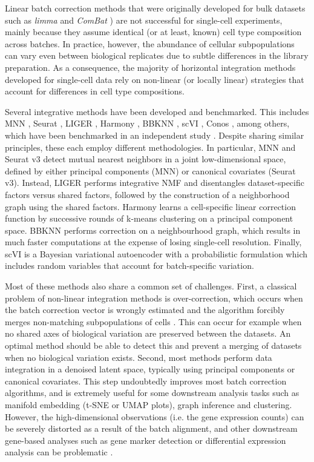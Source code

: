 Linear batch correction methods that were originally developed for bulk datasets such as \textit{limma} \cite{Ritchie2015b} and \textit{ComBat} \cite{Johnson2006}) are not successful for single-cell experiments, mainly because they assume identical (or at least, known) cell type composition across batches. In practice, however, the abundance of cellular subpopulations can vary even between biological replicates due to subtle differences in the library preparation. As a consequence, the majority of horizontal integration methods developed for single-cell data rely on non-linear (or locally linear) strategies that account for differences in cell type compositions.

Several integrative methods have been developed and benchmarked. This includes MNN \cite{Haghverdi2018}, Seurat \cite{Butler2018}, LIGER \cite{Welch2019}, Harmony \cite{Korsunsky2019}, BBKNN \cite{Polanski2019}, scVI \cite{Lopez2018}, Conos \cite{Barkas2019}, among others, which have been benchmarked in an independent study \cite{Luecken2020}. Despite sharing similar principles, these each employ different methodologies. In particular, MNN and Seurat v3 detect mutual nearest neighbors in a joint low-dimensional space, defined by either principal components (MNN) or canonical covariates (Seurat v3). Instead, LIGER performs integrative NMF and disentangles dataset-specific factors versus shared factors, followed by the construction of a neighborhood graph using the shared factors. Harmony learns a cell-specific linear correction function by successive rounds of k-means clustering on a principal component space. BBKNN performs correction on a neighbourhood graph, which results in much faster computations at the expense of losing single-cell resolution. Finally, scVI is a Bayesian variational autoencoder with a probabilistic formulation which includes random variables that account for batch-specific variation.

Most of these methods also share a common set of challenges. First, a classical problem of non-linear integration methods is over-correction, which occurs when the batch correction vector is wrongly estimated and the algorithm forcibly merges non-matching subpopulations of cells \cite{Luecken2020}. This can occur for example when no shared axes of biological variation are preserved between the datasets. An optimal method should be able to detect this and prevent a merging of datasets when no biological variation exists. Second, most methods perform data integration in a denoised latent space, typically using principal components or canonical covariates. This step undoubtedly improves most batch correction algorithms, and is extremely useful for some downstream analysis tasks such as manifold embedding (t-SNE or UMAP plots), graph inference and clustering. However, the high-dimensional observations (i.e. the gene expression counts) can be severely distorted as a result of the batch alignment, and other downstream gene-based analyses such as gene marker detection or differential expression analysis can be problematic \cite{Haghverdi2018}.

